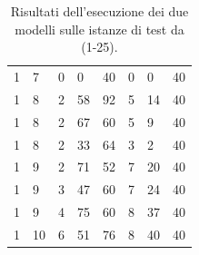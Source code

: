 \documentclass[12pt, italian, openany]{book}
\begin{document}
\begin{table}[h]
\begin{tabular}{ll|lll|lll}
1           & 7            & 0    & 0         & 40    & 0    & 0         & 40   \\
1           & 8            & 2    & 58        & 92    & 5    & 14        & 40   \\
1           & 8            & 2    & 67        & 60    & 5    & 9         & 40   \\
1           & 8            & 2    & 33        & 64    & 3    & 2         & 40   \\
1           & 9            & 2    & 71        & 52    & 7    & 20        & 40   \\
1           & 9            & 3    & 47        & 60    & 7    & 24        & 40   \\
1           & 9            & 4    & 75        & 60    & 8    & 37        & 40   \\
1           & 10           & 6    & 51        & 76    & 8    & 40        & 40   \\ \hline
\end{tabular}
\caption{Risultati dell'esecuzione dei due modelli sulle istanze di test da (1-25).}
\label{res1}
\end{table}
\end{document}
